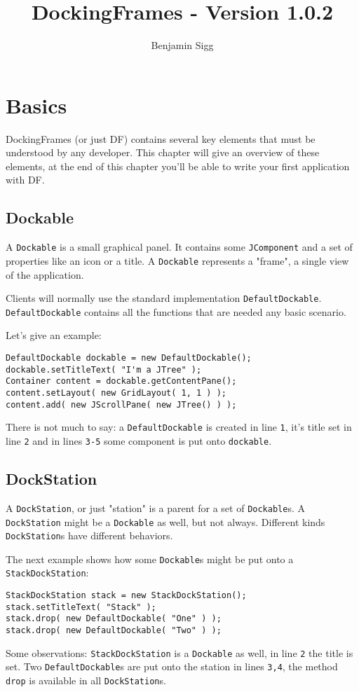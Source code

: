 \documentclass[a4paper,10pt]{article}
\title{DockingFrames - Version 1.0.2}
\author{Benjamin Sigg}
\newcommand{\src}[1]{\lstinline[basicstyle=\ttfamily]|#1|}
\begin{document}
\maketitle
\tableofcontents
\newpage


\begin{abstract}
\end{abstract}

\section{Basics}
DockingFrames (or just DF) contains several key elements that must be understood by any developer. This chapter will give an overview of these elements, at the end of this chapter you'll be able to write your first application with DF.

\subsection{Dockable}
A \src{Dockable} is a small graphical panel. It contains some \src{JComponent} and a set of properties like an icon or a title. A \src{Dockable} represents a "frame", a single view of the application.

Clients will normally use the standard implementation \src{DefaultDockable}. \src{DefaultDockable} contains all the functions that are needed any basic scenario.

Let's give an example:
\begin{lstlisting}
DefaultDockable dockable = new DefaultDockable();
dockable.setTitleText( "I'm a JTree" );
Container content = dockable.getContentPane();
content.setLayout( new GridLayout( 1, 1 ) );
content.add( new JScrollPane( new JTree() ) );
\end{lstlisting}
There is not much to say: a \src{DefaultDockable} is created in line \src{1}, it's title set in line \src{2} and in lines \src{3-5} some component is put onto \src{dockable}.

\subsection{DockStation}
A \src{DockStation}, or just "station" is a parent for a set of \src{Dockable}s. A \src{DockStation} might be a \src{Dockable} as well, but not always. Different kinds \src{DockStation}s have different behaviors.

The next example shows how some \src{Dockable}s might be put onto a \src{StackDockStation}:
\begin{lstlisting}
StackDockStation stack = new StackDockStation();
stack.setTitleText( "Stack" );
stack.drop( new DefaultDockable( "One" ) );
stack.drop( new DefaultDockable( "Two" ) );
\end{lstlisting}
Some observations: \src{StackDockStation} is a \src{Dockable} as well, in line \src{2} the title is set. Two \src{DefaultDockable}s are put onto the station in lines \src{3,4}, the method \src{drop} is available in all \src{DockStation}s.
\end{document}
